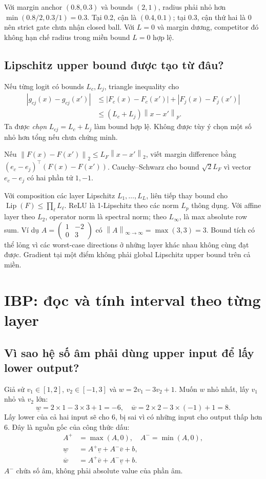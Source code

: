 \documentclass[11pt,a4paper]{article}
\newcommand{\norm}[1]{\left\lVert#1\right\rVert}
\theoremstyle{definition}
\begin{document}
Với margin anchor $(0.8,0.3)$ và bounds $(2,1)$, radius phải nhỏ hơn
$\min(0.8/2,0.3/1)=0.3$. Tại 0.2, cận là $(0.4,0.1)$; tại 0.3, cận
thứ hai là 0 nên strict gate chưa nhận closed ball. Với $L=0$ và margin
dương, competitor đó không hạn chế radius trong miền bound $L=0$ hợp lệ.

\subsection{Lipschitz upper bound được tạo từ đâu?}
Nếu từng logit có bounds $L_c,L_j$, triangle inequality cho
\begin{align}
|g_{cj}(x)-g_{cj}(x')|
&\le|F_c(x)-F_c(x')|+|F_j(x)-F_j(x')|\\
&\le(L_c+L_j)\norm{x-x'}_p.
\end{align}
Ta được \emph{chọn} $L_{cj}=L_c+L_j$ làm bound hợp lệ. Không được tùy ý
chọn một số nhỏ hơn tổng nếu chưa chứng minh.

Nếu $\norm{F(x)-F(x')}_2\le L_F\norm{x-x'}_2$, viết margin difference
bằng $(e_c-e_j)^\top(F(x)-F(x'))$. Cauchy--Schwarz cho bound
$\sqrt2L_F$ vì vector $e_c-e_j$ có hai phần tử $1,-1$.

Với composition các layer Lipschitz $L_1,\ldots,L_L$, liên tiếp thay
bound cho $\operatorname{Lip}(F)\le\prod_\ell L_\ell$. ReLU là
1-Lipschitz theo các norm $L_p$ thông dụng. Với affine layer theo $L_2$,
operator norm là spectral norm; theo $L_\infty$, là max absolute row sum.
Ví dụ $A=\left(\begin{smallmatrix}1&-2\\0&3\end{smallmatrix}\right)$ có
$\norm{A}_{\infty\to\infty}=\max(3,3)=3$. Bound tích có thể lỏng vì các
worst-case directions ở những layer khác nhau không cùng đạt được.
Gradient tại một điểm không phải global Lipschitz upper bound trên cả miền.

\section{IBP: đọc và tính interval theo từng layer}
\subsection{Vì sao hệ số âm phải dùng upper input để lấy lower output?}
Giả sử $v_1\in[1,2]$, $v_2\in[-1,3]$ và
$w=2v_1-3v_2+1$. Muốn $w$ nhỏ nhất, lấy $v_1$ nhỏ và $v_2$ lớn:
\begin{equation}
\underline w=2\times1-3\times3+1=-6,
\quad
\overline w=2\times2-3\times(-1)+1=8.
\end{equation}
Lấy lower của cả hai input sẽ cho 6, bị sai vì có những input cho output
thấp hơn 6. Đây là nguồn gốc của công thức dấu:
\begin{align}
A^+&=\max(A,0),\quad A^-=\min(A,0),\\
\underline w&=A^+\underline v+A^-\overline v+b,\\
\overline w&=A^+\overline v+A^-\underline v+b.
\end{align}
$A^-$ chứa số âm, không phải absolute value của phần âm.
\end{document}

